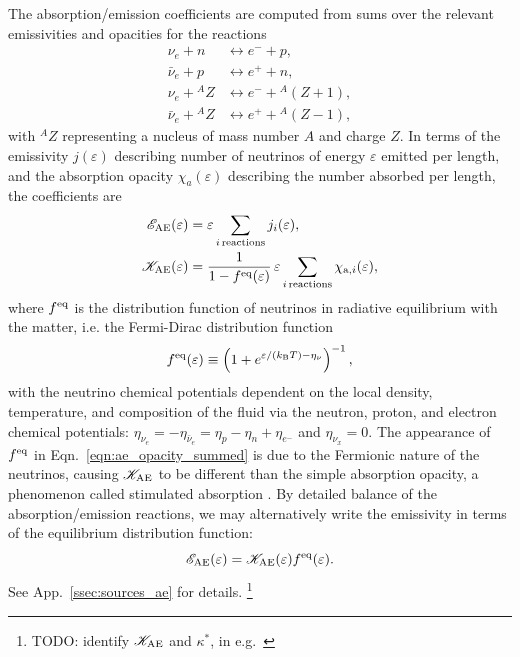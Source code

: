 \documentclass[aps,floatfix,prd,superscriptaddress,twocolumn]{revtex4-1}
\begin{document}
The absorption/emission coefficients are computed from sums
over the relevant emissivities and opacities
for the reactions
\begin{align}
  \nu_e + n            &\leftrightarrow e^- + p,\nonumber\\
  \bar{\nu}_e + p      &\leftrightarrow e^+ + n,\nonumber\\
  \nu_e + {}^AZ        &\leftrightarrow e^- + {}^A(Z+1),\nonumber\\
  \bar{\nu}_e + {}^AZ  &\leftrightarrow e^+ + {}^A(Z-1),\nonumber
\end{align}
with ${}^AZ$ representing a nucleus of mass number $A$ and charge $Z$.
In terms of the emissivity $j(\varepsilon)$ describing number of neutrinos
of energy $\varepsilon$ emitted per length,
and the absorption opacity $\chi_a(\varepsilon)$
describing the number absorbed per length,
the coefficients are
\begin{align}
  \label{eqn:ae_emissivity_summed}
  \mathscr{E}_{\rm AE}(\varepsilon)
  &= \varepsilon \sum_{i\,{\rm reactions}} j_i(\varepsilon), \\
  \label{eqn:ae_opacity_summed}
  \mathscr{K}_{\rm AE}(\varepsilon)
  &= \frac{1}{1-f^{\rm eq}(\varepsilon)} \,
  \varepsilon \sum_{i\,{\rm reactions}} \chi_{{\rm a},i}(\varepsilon),
\end{align}
where $f^{\rm eq}$ is the distribution function of neutrinos in radiative
equilibrium with the matter, i.e. the Fermi-Dirac distribution function
\begin{equation}
  \label{eqn:feq}
  f^{\rm eq}(\varepsilon) \equiv
  \left(1+e^{\varepsilon/(k_{\rm B} T) -\eta_\nu}\right)^{-1},
\end{equation}
with the neutrino chemical potentials dependent on the local density,
temperature, and composition of the fluid via the neutron, proton,
and electron chemical potentials:
$\eta_{\nu_e}=-\eta_{\bar{\nu}_e}=\eta_p-\eta_n+\eta_{e^-}$ and
$\eta_{\nu_x}=0$.
The appearance of $f^{\rm eq}$ in Eqn.~\ref{eqn:ae_opacity_summed} is due to
the Fermionic nature of the neutrinos, causing $\mathscr{K}_{\rm AE}$ to be
different than the simple absorption opacity,
a phenomenon called stimulated absorption \cite{burr2006-neutrino_opacities}.
By detailed balance of the absorption/emission reactions, we may alternatively
write the emissivity in terms of the equilibrium distribution function:
\begin{equation}
  \label{eqn:ae_emissivity_feq}
  \mathscr{E}_{\rm AE}(\varepsilon)
  = \mathscr{K}_{\rm AE}(\varepsilon) f^{\rm eq}(\varepsilon).
\end{equation}
See App.~\ref{ssec:sources_ae} for details.
\footnote{TODO: identify $\mathscr{K}_{\rm AE}$ and $\kappa^*$,
  in e.g.\ \cite{hari2010-gr_nunubar_collapsar}}
\end{document}
